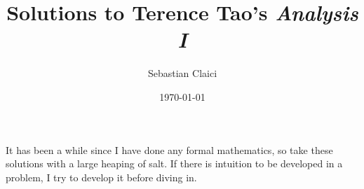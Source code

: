 \documentclass[12pt, letterpaper]{article}
\title{Solutions to Terence Tao's \emph{Analysis I}}
\author{Sebastian Claici}
\date{\today}
\begin{document}
\maketitle
\tableofcontents

It has been a while since I have done any formal mathematics, so take these solutions with a large heaping of salt. If there is intuition to be developed in a problem, I try to develop it before diving in.


\end{document}
